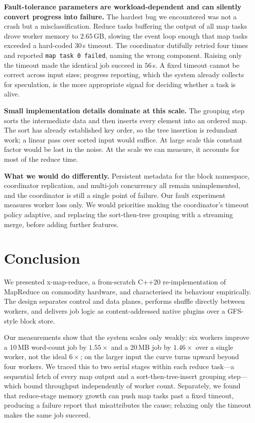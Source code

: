 \documentclass[conference]{IEEEtran}
\begin{document}
\textbf{Fault-tolerance parameters are workload-dependent and can silently
convert progress into failure.} The hardest bug we encountered was not a
crash but a misclassification. Reduce tasks buffering the output of all map
tasks drove worker memory to $2.65$\,GB, slowing the event loop enough that
map tasks exceeded a hard-coded $30$\,s timeout. The coordinator dutifully
retried four times and reported \texttt{map task 0 failed}, naming the wrong
component. Raising only the timeout made the identical job succeed in
$56$\,s. A fixed timeout cannot be correct across input sizes; progress
reporting, which the system already collects for speculation, is the more
appropriate signal for deciding whether a task is alive.

\textbf{Small implementation details dominate at this scale.} The grouping
step sorts the intermediate data and then inserts every element into an
ordered map. The sort has already established key order, so the tree
insertion is redundant work; a linear pass over sorted input would suffice.
At large scale this constant factor would be lost in the noise. At the scale
we can measure, it accounts for most of the reduce time.

\textbf{What we would do differently.} Persistent metadata for the block
namespace, coordinator replication, and multi-job concurrency all remain
unimplemented, and the coordinator is still a single point of failure. Our
fault experiment measures worker loss only. We would prioritise making the
coordinator's timeout policy adaptive, and replacing the sort-then-tree
grouping with a streaming merge, before adding further features.

\section{Conclusion}
\label{sec:conclusion}

We presented x-map-reduce, a from-scratch C++20 re-implementation of
MapReduce on commodity hardware, and characterised its behaviour empirically.
The design separates control and data planes, performs shuffle directly
between workers, and delivers job logic as content-addressed native plugins
over a GFS-style block store.

Our measurements show that the system scales only weakly: six workers
improve a 10\,MB word-count job by $1.55\times$ and a 20\,MB job by
$1.46\times$ over a single worker, not the ideal $6\times$; on the larger
input the curve turns upward beyond four workers. We traced this to two
serial stages within each reduce task---a sequential fetch of every map
output and a sort-then-tree-insert grouping step---which bound throughput
independently of worker count.
Separately, we found that reduce-stage memory growth can push map tasks past
a fixed timeout, producing a failure report that misattributes the cause;
relaxing only the timeout makes the same job succeed.
\end{document}
